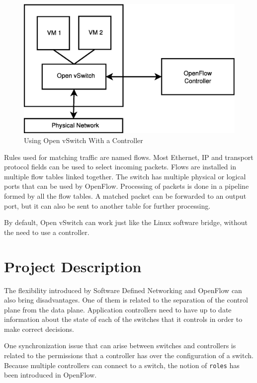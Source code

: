 \begin{figure}
\begin{center}
\includegraphics[scale=0.5]{src/img/ovs-arch.eps}
\end{center}
\caption{Using Open vSwitch With a Controller}
\label{fig:genarch}
\end{figure}

Rules used for matching traffic are named flows. Most Ethernet, IP and transport protocol fields can be used to
select incoming packets. Flows are installed in multiple flow tables linked together.
The switch has multiple physical or logical ports that can be used by OpenFlow. Processing of packets is done
in a pipeline formed by all the flow tables. A matched packet can be forwarded to an output port, but it can
also be sent to another table for further processing.

By default, Open vSwitch can work just like the Linux software bridge, without the need to use a controller.

\section{Project Description}
\label{sec:proj}

The flexibility introduced by Software Defined Networking and OpenFlow can also bring disadvantages. One
of them is related to the separation of the control plane from the data plane. Application controllers
need to have up to date information about the state of each of the switches that it controls in order to
make correct decisions.

One synchronization issue that can arise between switches and controllers is related to the permissions
that a controller has over the configuration of a switch. Because multiple controllers can connect to a
switch, the notion of \texttt{roles} has been introduced in OpenFlow.

